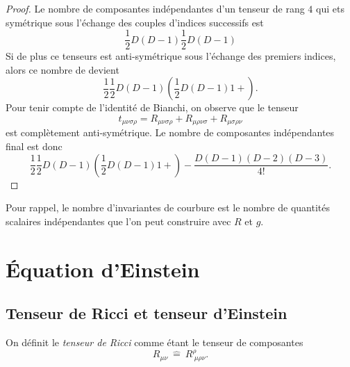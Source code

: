 \documentclass[a4paper,11pt]{report}
\begin{document}
                \begin{proof}
                    Le nombre de composantes indépendantes d'un tenseur de rang $4$ qui ets symétrique sous l'échange des couples d'indices successifs est 
                    \begin{equation}
                        \frac{1}{2}D(D-1)\frac{1}{2}D(D-1)
                    \end{equation}
                    Si de plus ce tenseurs est anti-symétrique sous l'échange des premiers indices, alors ce nombre de devient
                    \begin{equation}
                        \frac{1}{2}\frac{1}{2}D(D-1)\left( \frac{1}{2}D(D-1)1+ \right).
                    \end{equation}
                    Pour tenir compte de l'identité de Bianchi, on observe que le tenseur
                    \begin{equation}
                        t_{\mu\nu\sigma\rho} = R_{\mu\nu\sigma\rho}+R_{\mu\rho\nu\sigma}+R_{\mu\sigma\rho\nu}
                    \end{equation}
                    est complètement anti-symétrique. Le nombre de composantes indépendantes final est donc 
                    \begin{equation}
                        \frac{1}{2}\frac{1}{2}D(D-1)\left( \frac{1}{2}D(D-1)1+ \right)  -\frac{D(D-1)(D-2)(D-3)}{4!}.
                    \end{equation}
                \end{proof}
                
                Pour rappel, le nombre d'invariantes de courbure est le nombre de quantités scalaires indépendantes que l'on peut construire avec $R$ et $g$.
                
\chapter{Équation d'Einstein}

    
        
    \section{Tenseur de Ricci et tenseur d'Einstein}
        
        \begin{defn}
            On définit le \textit{tenseur de Ricci} comme étant le tenseur de composantes
            \begin{equation}
                R_{\mu\nu} ~\hat{=}~ R^\rho_{~\mu\rho\nu}.
            \end{equation}
        \end{defn}
        
\end{document}
